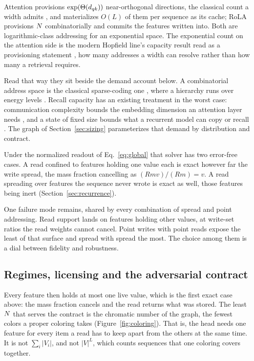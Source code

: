 Attention provisions $\exp(\Theta(d_{qk}))$ near-orthogonal directions, the classical count a width admits \citep{johnson1984}, and materializes $O(L)$ of them per sequence as its cache; RoLA provisions $N$ combinatorially and commits the features written into. Both are logarithmic-class addressing for an exponential space. The exponential count on the attention side is the modern Hopfield line's capacity result read as a provisioning statement \citep{krotov2016dam, demircigil2017capacity, ramsauer2021hopfield, hu2024optimal}, how many addresses a width can resolve rather than how many a retrieval requires.

Read that way they sit beside the demand account below. A combinatorial address space is the classical sparse-coding one \citep{willshaw1969, kanerva1988sdm}, where a hierarchy runs over energy levels \citep{krotov2021hierarchical}. Recall capacity has an existing treatment in the worst case: communication complexity bounds the embedding dimension an attention layer needs \citep{sanford2023representational}, and a state of fixed size bounds what a recurrent model can copy or recall \citep{jelassi2024copying, arora2023zoology}. The graph of Section~\ref{sec:sizing} parameterizes that demand by distribution and contract.

Under the normalized readout of Eq.~\eqref{eq:global} that solver has two error-free cases. A read confined to features holding one value each is exact however far the write spread, the mass fraction cancelling as $(R m v)/(R m) = v$. A read spreading over features the sequence never wrote is exact as well, those features being inert (Section~\ref{sec:recurrence}).

One failure mode remains, shared by every combination of spread and point addressing. Read support lands on features holding other values, at write-set ratios the read weights cannot cancel. Point writes with point reads expose the least of that surface and spread with spread the most. The choice among them is a dial between fidelity and robustness.

\subsection{Regimes, licensing and the adversarial contract}
\label{apd:regimes}

Every feature then holds at most one live value, which is the first exact case above: the mass fraction cancels and the read returns what was stored. The least $N$ that serves the contract is the chromatic number of the graph, the fewest colors a proper coloring takes (Figure~\ref{fig:coloring}). That is, the head needs one feature for every item a read has to keep apart from the others at the same time. It is not $\sum_i |V_i|$, and not $|V|^L$, which counts sequences that one coloring covers together.

